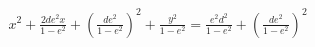 \documentclass[preview]{standalone}
\begin{document}
\begin{align*}
x^2+\frac{2de^2x}{1-e^2}+(\frac{de^2}{1-e^2})^2+\frac{y^2}{1-e^2}=\frac{e^2d^2}{1-e^2}+(\frac{de^2}{1-e^2})^2
\end{align*}
\end{document}

